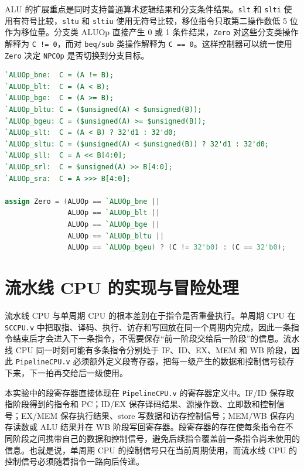\documentclass[UTF8,a4paper,12pt]{ctexart}
\begin{document}
ALU 的扩展重点是同时支持普通算术逻辑结果和分支条件结果。\texttt{slt} 和 \texttt{slti} 使用有符号比较，\texttt{sltu} 和 \texttt{sltiu} 使用无符号比较，移位指令只取第二操作数低 5 位作为移位量。分支类 ALUOp 直接产生 0 或 1 条件结果，\texttt{Zero} 对这些分支类操作解释为 \texttt{C != 0}，而对 \texttt{beq/sub} 类操作解释为 \texttt{C == 0}。这样控制器可以统一使用 \texttt{Zero} 决定 \texttt{NPCOp} 是否切换到分支目标。

\begin{lstlisting}[language=Verilog,caption={单周期 ALU 中比较、分支和移位的实现}]
`ALUOp_bne:  C = (A != B);
`ALUOp_blt:  C = (A < B);
`ALUOp_bge:  C = (A >= B);
`ALUOp_bltu: C = ($unsigned(A) < $unsigned(B));
`ALUOp_bgeu: C = ($unsigned(A) >= $unsigned(B));
`ALUOp_slt:  C = (A < B) ? 32'd1 : 32'd0;
`ALUOp_sltu: C = ($unsigned(A) < $unsigned(B)) ? 32'd1 : 32'd0;
`ALUOp_sll:  C = A << B[4:0];
`ALUOp_srl:  C = $unsigned(A) >> B[4:0];
`ALUOp_sra:  C = A >>> B[4:0];

assign Zero = (ALUOp == `ALUOp_bne ||
               ALUOp == `ALUOp_blt ||
               ALUOp == `ALUOp_bge ||
               ALUOp == `ALUOp_bltu ||
               ALUOp == `ALUOp_bgeu) ? (C != 32'b0) : (C == 32'b0);
\end{lstlisting}

\section{流水线 CPU 的实现与冒险处理}

流水线 CPU 与单周期 CPU 的根本差别在于指令是否重叠执行。单周期 CPU 在 \texttt{SCCPU.v} 中把取指、译码、执行、访存和写回放在同一个周期内完成，因此一条指令结束后才会进入下一条指令，不需要保存“前一阶段交给后一阶段”的信息。流水线 CPU 同一时刻可能有多条指令分别处于 IF、ID、EX、MEM 和 WB 阶段，因此 \texttt{PipelineCPU.v} 必须额外定义段寄存器，把每一级产生的数据和控制信号锁存下来，下一拍再交给后一级使用。

本实验中的段寄存器直接体现在 \texttt{PipelineCPU.v} 的寄存器定义中。IF/ID 保存取指阶段得到的指令和 PC；ID/EX 保存译码结果、源操作数、立即数和控制信号；EX/MEM 保存执行结果、store 写数据和访存控制信号；MEM/WB 保存内存读数或 ALU 结果并在 WB 阶段写回寄存器。段寄存器的存在使每条指令在不同阶段之间携带自己的数据和控制信号，避免后续指令覆盖前一条指令尚未使用的信息。也就是说，单周期 CPU 的控制信号只在当前周期使用，而流水线 CPU 的控制信号必须随着指令一路向后传递。
\end{document}
